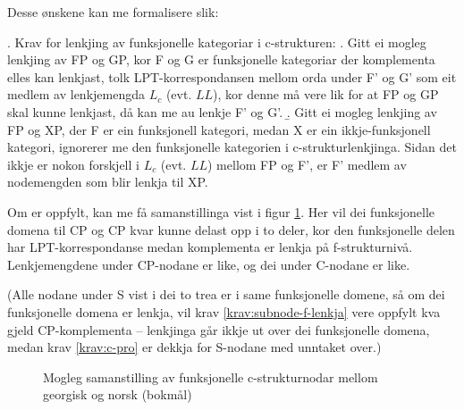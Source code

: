 \documentclass[11pt,a4paper,oneside,draft]{book}
\begin{document}
Desse ønskene kan me formalisere slik:

\ex. \label{fnordkrav} Krav for lenkjing av funksjonelle kategoriar i c-strukturen:
\a. Gitt ei mogleg lenkjing av FP og GP, kor F og G er funksjonelle
    kategoriar der komplementa elles kan lenkjast,
    tolk LPT-korrespondansen mellom orda under F' og G' som eit
    medlem av lenkjemengda $L_c$ (evt. $LL$), kor denne må vere lik
    for at FP og GP skal kunne lenkjast, då kan me au lenkje F' og G'.
\b. Gitt ei mogleg lenkjing av FP og XP, der F er ein funksjonell
    kategori, medan X er ein ikkje-funksjonell kategori, ignorerer me
    den funksjonelle kategorien i c-strukturlenkjinga. Sidan det ikkje
    er nokon forskjell i $L_c$ (evt. $LL$) mellom FP og F', er F' medlem
    av nodemengden som blir lenkja til XP.

Om \Last[a] er oppfylt, kan me få samanstillinga vist i figur
\ref{fig:fnord}. Her vil dei funksjonelle domena til CP og CP
kvar kunne delast opp i to deler, kor den funksjonelle delen har
LPT-korrespondanse medan komplementa er lenkja på
f-strukturnivå. Lenkjemengdene under CP-nodane er like, og dei under
C-nodane er like.

(Alle nodane under S vist i dei to trea er i same funksjonelle domene,
så om dei funksjonelle domena er lenkja, vil krav
\ref{krav:subnode-f-lenkja} vere oppfylt kva gjeld CP-komplementa --
lenkjinga går ikkje ut over dei funksjonelle domena, medan
krav \ref{krav:c-pro} er dekkja for S-nodane med unntaket over.)

  \begin{figure}[htp]
   \centering
  
  \caption{Mogleg samanstilling av funksjonelle c-strukturnodar mellom georgisk og norsk (bokmål)}
   \label{fig:fnord}
  \end{figure}
\end{document}
